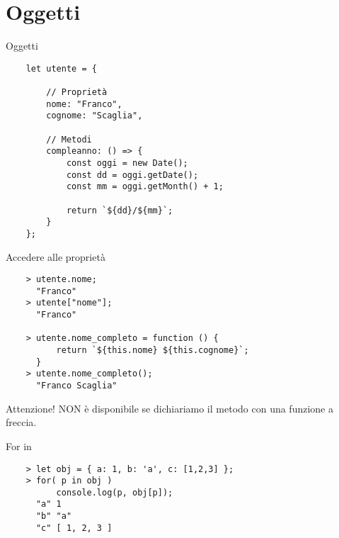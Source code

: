 \section{Oggetti}
\begin{frame}[fragile]{Oggetti}\transfade\centering
  \begin{verbatim}
    let utente = {

        // Proprietà
        nome: "Franco",
        cognome: "Scaglia",

        // Metodi
        compleanno: () => {
            const oggi = new Date();
            const dd = oggi.getDate();
            const mm = oggi.getMonth() + 1;

            return `${dd}/${mm}`;
        }
    };
  \end{verbatim}
\end{frame}

\begin{frame}[fragile]{Accedere alle proprietà}\transfade\centering
  \begin{verbatim}
    > utente.nome;
      "Franco"
    > utente["nome"];
      "Franco"

    > utente.nome_completo = function () {
          return `${this.nome} ${this.cognome}`;
      }
    > utente.nome_completo();
      "Franco Scaglia"
  \end{verbatim}
  \bigskip
  \alert{Attenzione!}  NON è disponibile se dichiariamo il metodo con una funzione a freccia.\\
\end{frame}

\begin{frame}[fragile]{For in}\transfade\centering
  \begin{verbatim}
    > let obj = { a: 1, b: 'a', c: [1,2,3] };
    > for( p in obj )
          console.log(p, obj[p]);
      "a" 1
      "b" "a"
      "c" [ 1, 2, 3 ]
  \end{verbatim}
\end{frame}